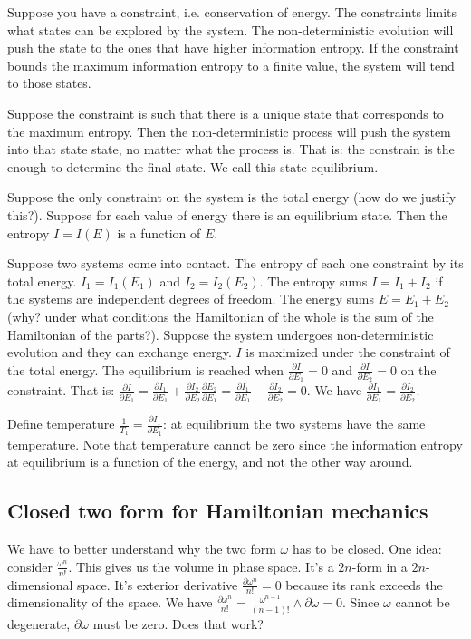 \documentclass[11pt,letterpaper,fleqn]{memoir} %
\begin{document}
Suppose you have a constraint, i.e. conservation of energy. The constraints limits what states can be explored by the system. The non-deterministic evolution will push the state to the ones that have higher information entropy. If the constraint bounds the maximum information entropy to a finite value, the system will tend to those states.

Suppose the constraint is such that there is a unique state that corresponds to the maximum entropy. Then the non-deterministic process will push the system into that state state, no matter what the process is. That is: the constrain is the enough to determine the final state. We call this state equilibrium.

Suppose the only constraint on the system is the total energy (how do we justify this?). Suppose for each value of energy there is an equilibrium state. Then the entropy $I=I(E)$ is a function of $E$.

Suppose two systems come into contact. The entropy of each one constraint by its total energy. $I_1=I_1(E_1)$ and $I_2=I_2(E_2)$. The entropy sums $I=I_1+I_2$ if the systems are independent degrees of freedom. The energy sums $E=E_1+E_2$ (why? under what conditions the Hamiltonian of the whole is the sum of the Hamiltonian of the parts?). Suppose the system undergoes non-deterministic evolution and they can exchange energy. $I$ is maximized under the constraint of the total energy. The equilibrium is reached when $\frac{\partial I}{\partial E_1} = 0$ and $\frac{\partial I}{\partial E_2} = 0$ on the constraint. That is: $\frac{\partial I}{\partial E_1} = \frac{\partial I_1}{\partial E_1} +\frac{\partial I_2}{\partial E_2} \frac{\partial E_2}{\partial E_1} = \frac{\partial I_1}{\partial E_1} -\frac{\partial I_2}{\partial E_2}=0$. We have $\frac{\partial I_1}{\partial E_1} = \frac{\partial I_2}{\partial E_2}$.

Define temperature $\frac{1}{T_1} = \frac{\partial I_1}{\partial E_1}$: at equilibrium the two systems have the same temperature. Note that temperature cannot be zero since the information entropy at equilibrium is a function of the energy, and not the other way around.

\subsection{Closed two form for Hamiltonian mechanics}

We have to better understand why the two form $\omega$ has to be closed. One idea: consider $\frac{\omega^n}{n!}$. This gives us the volume in phase space. It's a $2n$-form in a $2n$-dimensional space. It's exterior derivative $\frac{\partial\omega^n}{n!}=0$ because its rank exceeds the dimensionality of the space. We have $\frac{\partial\omega^n}{n!}=\frac{\omega^{n-1}}{(n-1)!}\wedge\partial\omega=0$. Since $\omega$ cannot be degenerate, $\partial \omega$ must be zero. Does that work?
\end{document}
